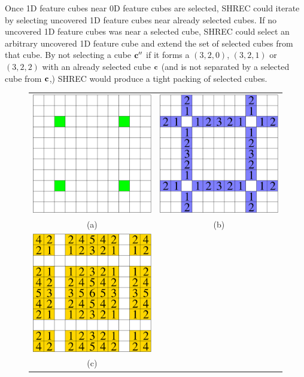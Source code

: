 Once 1D feature cubes near 0D feature cubes are selected,
SHREC could iterate by selecting uncovered 1D feature cubes 
near already selected cubes.
If no uncovered 1D feature cubes was near a selected cube,
SHREC could select an arbitrary uncovered 1D feature cube
and extend the set of selected cubes from that cube.
By not selecting a cube $\mathbf{c}''$ 
if it forms a $(3,2,0)$, $(3,2,1)$ or $(3,2,2)$
with an already selected cube $\mathbf{c}$ 
(and is not separated by a selected cube from $\mathbf{c}$,)
SHREC would produce a tight packing of selected cubes.

\suppressfloats

\begin{figure}[t]
\centering

\begin{tabular}{cc}
\includegraphics[width=0.4\linewidth]{images/mod6.eps} \qquad &
\qquad
\includegraphics[width=0.4\linewidth]{images/mod6_k_0.eps} \\
(a) & (b)
\\
\includegraphics[width=0.4\linewidth]{images/mod6_ka_kb.eps} \qquad &
\\
(c)
\end{tabular}


\end{figure}
